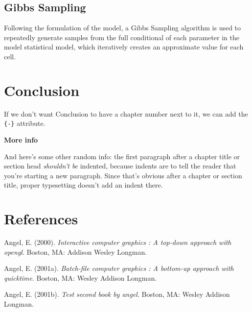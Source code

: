 \documentclass[12pt,twoside]{dukestatscithesis}
\theoremstyle{definition}
\theoremstyle{definition}
\theoremstyle{definition}
\theoremstyle{remark}
\begin{document}
\section{Gibbs Sampling}\label{gibbs-sampling}

Following the formulation of the model, a Gibbs Sampling algorithm is
used to repeatedly generate samples from the full conditional of each
parameter in the model statistical model, which iteratively creates an
approximate value for each cell.

\chapter*{Conclusion}\label{conclusion}

If we don't want Conclusion to have a chapter number next to it, we can
add the \texttt{\{-\}} attribute.

\textbf{More info}

And here's some other random info: the first paragraph after a chapter
title or section head \emph{shouldn't be} indented, because indents are
to tell the reader that you're starting a new paragraph. Since that's
obvious after a chapter or section title, proper typesetting doesn't add
an indent there.

\backmatter

\chapter*{References}\label{references}


\noindent

\setlength{\parindent}{-0.20in} \setlength{\leftskip}{0.20in}
\setlength{\parskip}{8pt}

\hypertarget{refs}{}
\hypertarget{ref-angel2000}{}
Angel, E. (2000). \emph{Interactive computer graphics : A top-down
approach with opengl}. Boston, MA: Addison Wesley Longman.

\hypertarget{ref-angel2001}{}
Angel, E. (2001a). \emph{Batch-file computer graphics : A bottom-up
approach with quicktime}. Boston, MA: Wesley Addison Longman.

\hypertarget{ref-angel2002a}{}
Angel, E. (2001b). \emph{Test second book by angel}. Boston, MA: Wesley
Addison Longman.


\end{document}
